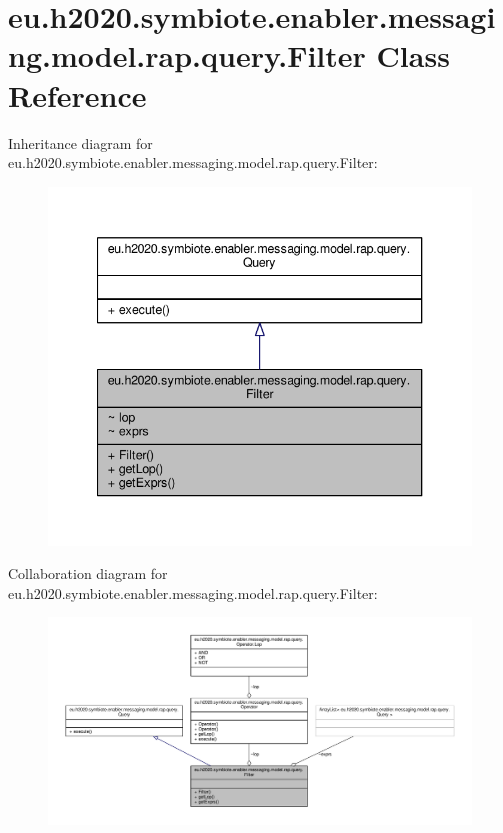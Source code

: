 \hypertarget{classeu_1_1h2020_1_1symbiote_1_1enabler_1_1messaging_1_1model_1_1rap_1_1query_1_1Filter}{}\section{eu.\+h2020.\+symbiote.\+enabler.\+messaging.\+model.\+rap.\+query.\+Filter Class Reference}
\label{classeu_1_1h2020_1_1symbiote_1_1enabler_1_1messaging_1_1model_1_1rap_1_1query_1_1Filter}


Inheritance diagram for eu.\+h2020.\+symbiote.\+enabler.\+messaging.\+model.\+rap.\+query.\+Filter\+:
\nopagebreak
\begin{figure}[H]
\begin{center}
\leavevmode
\includegraphics[width=340pt]{classeu_1_1h2020_1_1symbiote_1_1enabler_1_1messaging_1_1model_1_1rap_1_1query_1_1Filter__inherit__graph}
\end{center}
\end{figure}


Collaboration diagram for eu.\+h2020.\+symbiote.\+enabler.\+messaging.\+model.\+rap.\+query.\+Filter\+:
\nopagebreak
\begin{figure}[H]
\begin{center}
\leavevmode
\includegraphics[width=350pt]{classeu_1_1h2020_1_1symbiote_1_1enabler_1_1messaging_1_1model_1_1rap_1_1query_1_1Filter__coll__graph}
\end{center}
\end{figure}
